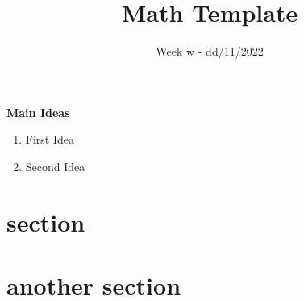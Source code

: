 \documentclass[11pt]{article}
\title{Math Template}
\date{Week w - dd/11/2022}
\def \stringone {\lipsum[1]}
\def \stringtwo {\lipsum[1-3]}
\def \stringthree {\lipsum[1-2]}
\begin{document}
    \maketitle

    \begin{abstract}
            \stringone \hfill{}
    \end{abstract}
    
    \textbf{\Large{}\vfill Main Ideas} 
        \begin{enumerate}
            \item First Idea
            \item Second Idea
        \end{enumerate}

    \begin{multicols}{2}
            \section{section}
                \stringtwo 
            \columnbreak \vfill
            \section{another section}
                   \stringthree 
    \end{multicols}
\end{document}
